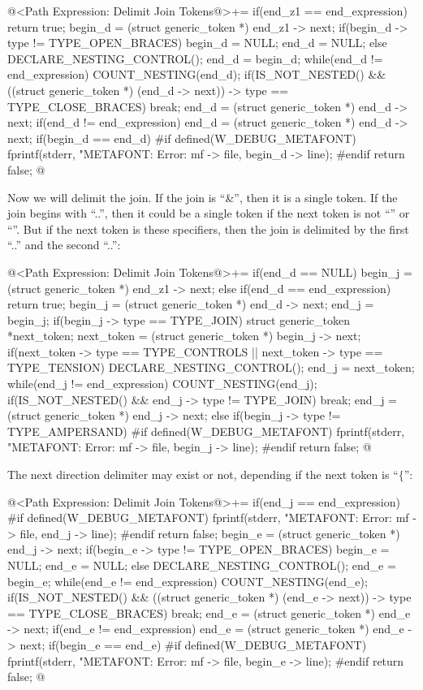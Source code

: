 \iniciocodigo
@<Path Expression: Delimit Join Tokens@>+=
if(end_z1 == end_expression)
  return true;
begin_d = (struct generic_token *) end_z1 -> next;
if(begin_d -> type != TYPE_OPEN_BRACES){
  begin_d = NULL;
  end_d = NULL;
}
else{
  DECLARE_NESTING_CONTROL();
  end_d = begin_d;
  while(end_d != end_expression){
    COUNT_NESTING(end_d);
    if(IS_NOT_NESTED() &&
       ((struct generic_token *) (end_d -> next)) -> type == TYPE_CLOSE_BRACES)
      break;
    end_d = (struct generic_token *) end_d -> next;
  }
  if(end_d != end_expression)
    end_d = (struct generic_token *) end_d -> next;
  if(begin_d == end_d){
#if defined(W_DEBUG_METAFONT)
    fprintf(stderr, "METAFONT: Error: %
            mf -> file, begin_d -> line);
#endif
    return false;
  }
}
@
\fimcodigo

Now we will delimit the join. If the join is ``\&'', then it is a
single token. If the join begins with ``..'', then it could be a
single token if the next token is not ``'' or
``''. But if the next token is these specifiers,
then the join is delimited by the first ``..'' and the second ``..'':

\iniciocodigo
@<Path Expression: Delimit Join Tokens@>+=
if(end_d == NULL)
  begin_j = (struct generic_token *) end_z1 -> next;
else{
  if(end_d == end_expression)
    return true;
  begin_j = (struct generic_token *) end_d -> next;
}
end_j = begin_j;
if(begin_j -> type == TYPE_JOIN){
  struct generic_token *next_token;
  next_token = (struct generic_token *) begin_j -> next;
  if(next_token -> type == TYPE_CONTROLS || next_token -> type == TYPE_TENSION){
    DECLARE_NESTING_CONTROL();
    end_j = next_token;
    while(end_j != end_expression){
      COUNT_NESTING(end_j);
      if(IS_NOT_NESTED() && end_j -> type != TYPE_JOIN)
        break;
      end_j = (struct generic_token *) end_j -> next;
    }
  }
}
else if(begin_j -> type != TYPE_AMPERSAND){
#if defined(W_DEBUG_METAFONT)
  fprintf(stderr, "METAFONT: Error: %
          mf -> file, begin_j -> line);
#endif
  return false;
}
@
\fimcodigo

The next direction delimiter may exist or not, depending if the next
token is ``$\{$'':

\iniciocodigo
@<Path Expression: Delimit Join Tokens@>+=
if(end_j == end_expression){
#if defined(W_DEBUG_METAFONT)
  fprintf(stderr, "METAFONT: Error: %
          mf -> file, end_j -> line);
#endif
  return false;
}
begin_e = (struct generic_token *) end_j -> next;
if(begin_e -> type != TYPE_OPEN_BRACES){
  begin_e = NULL;
  end_e = NULL;
}
else{
  DECLARE_NESTING_CONTROL();
  end_e = begin_e;
  while(end_e  != end_expression){
    COUNT_NESTING(end_e);
    if(IS_NOT_NESTED() &&
       ((struct generic_token *) (end_e -> next)) ->  type == TYPE_CLOSE_BRACES)
      break;
    end_e = (struct generic_token *) end_e -> next;
  }
  if(end_e != end_expression)
    end_e = (struct generic_token *) end_e -> next;
  if(begin_e == end_e){
#if defined(W_DEBUG_METAFONT)
    fprintf(stderr, "METAFONT: Error: %
            mf -> file, begin_e -> line);
#endif
    return false;
  }
}
@
\fimcodigo

